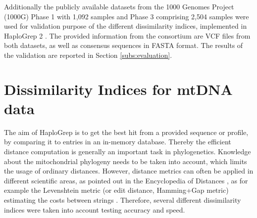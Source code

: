 Additionally the publicly available datasets from the 1000 Genomes Project (1000G) Phase 1 with 1,092 samples and Phase 3 comprising 2,504 samples were used for validation purpose of the different dissimilarity indices, implemented in HaploGrep 2 \cite{Weissensteiner2016a}. The provided information from the consortium are VCF files from both datasets, as well as consensus sequences in FASTA format. The results of the validation are reported in Section \ref{subs:evaluation}. 

\section{Dissimilarity Indices for mtDNA data}\label{hg:dissimilarity}
\label{subs:distance}
 The aim of HaploGrep is to get the best hit from a provided sequence or profile, by comparing it to entries in an in-memory database. Thereby the efficient distance computation is generally an important task in phylogenetics. Knowledge about the mitochondrial phylogeny needs to be taken into account, which limits the usage of ordinary distances. However, distance metrics can often be applied in different scientific areas, as pointed out in the Encyclopedia of Distances \cite{Deza2009}, as for example the Levenshtein metric (or edit distance, Hamming+Gap metric) estimating the costs between strings  \cite{Deza2009}. Therefore, several different dissimilarity indices were taken into account testing accuracy and speed. 

